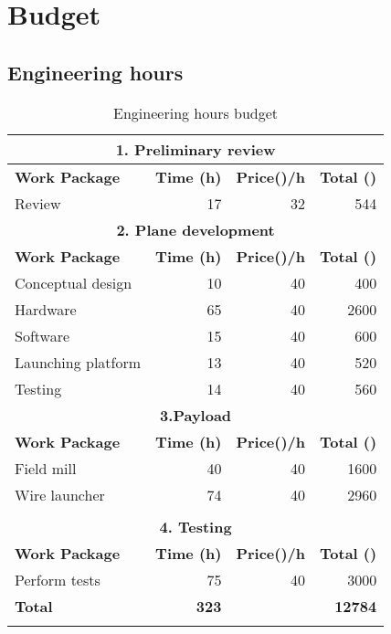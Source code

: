 \chapter{Budget}
\vspace{2.5cm}
\section{Engineering hours}

\begin{longtable}[htb]{@{}lrrr@{}}\toprule[3pt]
	\multicolumn{4}{c}{\textbf{\large 1. Preliminary review } }\\ \midrule[2pt]
	\textbf{Work Package} &\textbf{Time (h)} &\textbf{Price(\officialeuro)/h}&\textbf{Total (\officialeuro)}\\ \midrule[1pt]
	Review &17&32&544\\
	\midrule[2pt]
	\multicolumn{4}{c}{\textbf{\large 2. Plane development } }\\ \midrule[2pt]
	\textbf{Work Package} &\textbf{Time (h)} &\textbf{Price(\officialeuro)/h}&\textbf{Total (\officialeuro)}\\ \midrule[1pt]
	Conceptual design& 10&40&400\\
	Hardware& 65&40&2600\\
	Software& 15&40&600\\
	Launching platform&13&40&520\\
	Testing&14&40&560\\
	
	\midrule[2pt]
	\multicolumn{4}{c}{\textbf{\large 3.Payload } }\\ \midrule[2pt]
	\textbf{Work Package} &\textbf{Time (h)} &\textbf{Price(\officialeuro)/h}&\textbf{Total (\officialeuro)}\\ \midrule[1pt]
	Field mill&40&40&1600\\
	Wire launcher&74&40&2960\\
	&&&\\
	\midrule[2pt]
	\multicolumn{4}{c}{\textbf{\large 4. Testing } }\\ \midrule[2pt]
	\textbf{Work Package} &\textbf{Time (h)} &\textbf{Price(\officialeuro)/h}&\textbf{Total (\officialeuro)}\\ \midrule[1pt]
	Perform tests &75&40&3000\\
	
	\midrule[2pt]
	 \Large \textbf{Total}& \textbf{323}& & \textbf{12784}\\
	\bottomrule[3pt]
	\caption{Engineering hours budget}
\end{longtable}

